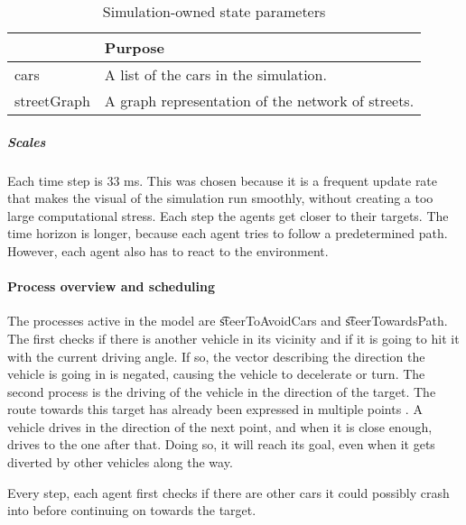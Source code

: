 	\begin{table}[H]
		\centering
		\begin{tabular}{ >{\ttfamily}l  p{10.5cm} }
			\toprule
			\normalfont{Parameter}	& Purpose \\  
			\midrule
			cars 					& A list of the cars in the simulation. \\ 
			streetGraph		 		& A graph representation of the network of streets. \\ 
			\bottomrule
		\end{tabular}
		\caption{Simulation-owned state parameters}
		\label{tab:par:method:model:overview:state:highlevel:sim}
	\end{table}


	\subparagraph{Scales}


	Each time step is 33 ms. This was chosen because it is a frequent update rate that makes the visual of the simulation run smoothly, without creating a too large computational stress. Each step the agents get closer to their targets. The time horizon is longer, because each agent tries to follow a predetermined path. However, each agent also has to react to the environment. 



\paragraph{Process overview and scheduling}
\label{par:method:model:overview:process}

The processes active in the model are \t{steerToAvoidCars} and \t{steerTowardsPath}. 
The first checks if there is another vehicle in its vicinity and if it is going to hit it with the current driving angle. If so, the vector describing the direction the vehicle is going in is negated, causing the vehicle to decelerate or turn.
The second process is the driving of the vehicle in the direction of the target. The route towards this target has already been expressed in multiple points . A vehicle drives in the direction of the next point, and when it is close enough, drives to the one after that. Doing so, it will reach its goal, even when it gets diverted by other vehicles along the way.

Every step, each agent first checks if there are other cars it could possibly crash into before continuing on towards the target. 

